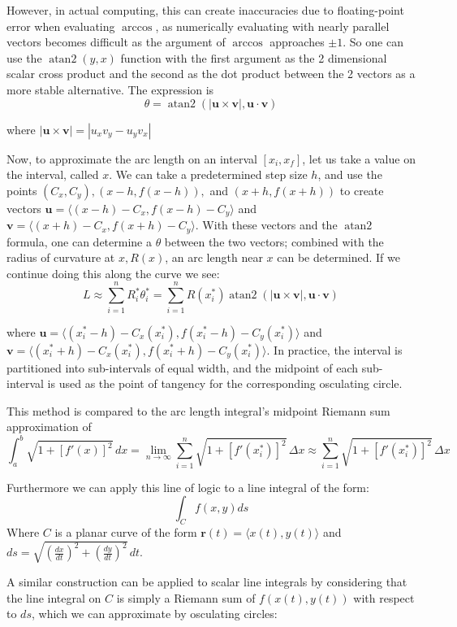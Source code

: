 \documentclass{article}
\begin{document}
However, in actual computing, this can create inaccuracies due to floating-point error when evaluating $\arccos$, as numerically evaluating with nearly parallel vectors becomes difficult as the argument of $\arccos$ approaches $\pm1$. So one can use the $\operatorname{atan2}(y,x)$ function with the first argument as the 2 dimensional scalar cross product and the second as the dot product between the 2 vectors as a more stable alternative. The expression is
\[
\theta = \operatorname{atan2}(|\mathbf{u} \times \mathbf{v}|,\mathbf{u} \cdot \mathbf{v})
\]

where $|\mathbf{u} \times \mathbf{v}| = |u_xv_y-u_yv_x|$

Now, to approximate the arc length on an interval $[x_i, x_f]$, let us take a value on the interval, called $x$. We can take a predetermined step size $h$, and use the points $(C_x, C_y), (x-h, f(x-h)),$ and $(x+h, f(x+h))$ to create vectors $\mathbf{u} = \langle(x-h)-C_x, f(x-h)-C_y\rangle$ and $\mathbf{v} = \langle(x+h)-C_x, f(x+h)-C_y\rangle$. With these vectors and the $\operatorname{atan2}$ formula, one can determine a $\theta$ between the two vectors; combined with the radius of curvature at $x, R(x)$, an arc length near $x$ can be determined. If we continue doing this along the curve we see:
\[
L \approx \sum_{i=1}^{n} R_i^*\theta_i^* = \sum_{i=1}^{n} R(x_i^*)\operatorname{atan2}(|\mathbf{u} \times \mathbf{v}|,\mathbf{u} \cdot \mathbf{v})
\]

where $\mathbf{u} = \langle(x_i^*-h)-C_x(x_i^*), f(x_i^*-h)-C_y(x_i^*)\rangle$ 
and $\mathbf{v} = \langle(x_i^*+h)-C_x(x_i^*), f(x_i^*+h)-C_y(x_i^*)\rangle$.
In practice, the interval is partitioned into sub-intervals of equal width, and the midpoint of each sub-interval is used as the point of tangency for the corresponding osculating circle.

This method is compared to the arc length integral's midpoint Riemann sum approximation of
\[
\int_a^b\sqrt{1+[f'(x)]^2}\,dx = \lim_{n \to \infty}\sum_{i=1}^{n} \sqrt{1+[f'(x_i^*)]^2}\,\Delta x\approx \sum_{i=1}^{n} \sqrt{1+[f'(x_i^*)]^2}\,\Delta x
\]

Furthermore we can apply this line of logic to a line integral of the form:
\[
\int_C f(x,y)ds
\]
Where $C$ is a planar curve of the form $\mathbf{r}(t) = \langle x(t),y(t)\rangle$ and $ds = \sqrt{(\frac{dx}{dt})^2+(\frac{dy}{dt})^2}\,dt$.

A similar construction can be applied to scalar line integrals by considering that the line integral on $C$ is simply a Riemann sum of $f(x(t),y(t))$ with respect to $ds$, which we can approximate by osculating circles:
\end{document}
